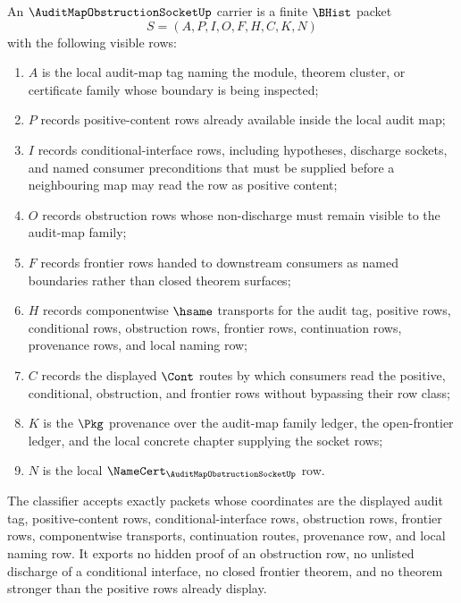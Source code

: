 \begin{definition}
\label{def:audit-map-obstruction-socket-carrier}
An $\AuditMapObstructionSocketUp$ carrier is a finite $\BHist$ packet
$$
S=(A,P,I,O,F,H,C,K,N)
$$
with the following visible rows:
\begin{enumerate}
\item $A$ is the local audit-map tag naming the module, theorem cluster, or certificate family whose boundary is being inspected;
\item $P$ records positive-content rows already available inside the local audit map;
\item $I$ records conditional-interface rows, including hypotheses, discharge sockets, and named consumer preconditions that must be supplied before a neighbouring map may read the row as positive content;
\item $O$ records obstruction rows whose non-discharge must remain visible to the audit-map family;
\item $F$ records frontier rows handed to downstream consumers as named boundaries rather than closed theorem surfaces;
\item $H$ records componentwise $\hsame$ transports for the audit tag, positive rows, conditional rows, obstruction rows, frontier rows, continuation rows, provenance rows, and local naming row;
\item $C$ records the displayed $\Cont$ routes by which consumers read the positive, conditional, obstruction, and frontier rows without bypassing their row class;
\item $K$ is the $\Pkg$ provenance over the audit-map family ledger, the open-frontier ledger, and the local concrete chapter supplying the socket rows;
\item $N$ is the local $\NameCert_{\AuditMapObstructionSocketUp}$ row.
\end{enumerate}
The classifier accepts exactly packets whose coordinates are the displayed audit tag, positive-content rows, conditional-interface rows, obstruction rows, frontier rows, componentwise transports, continuation routes, provenance row, and local naming row. It exports no hidden proof of an obstruction row, no unlisted discharge of a conditional interface, no closed frontier theorem, and no theorem stronger than the positive rows already display.
\end{definition}

